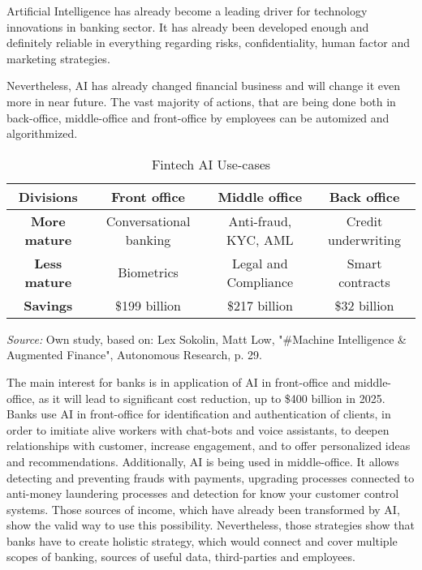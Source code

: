 



Artificial Intelligence has already become a leading driver for technology innovations in banking sector.
It has already been developed enough and definitely reliable in everything regarding risks, confidentiality, human factor and marketing strategies.

Nevertheless, AI has already changed financial business and will change it even more in near future.
The vast majority of actions, that are being done both in back-office, middle-office and front-office by employees can be automized and algorithmized.

\begin{table}
    \centering
    \begin{tabular}{| c | c | c | c |}
        \hline 
        \textbf{Divisions} &
            Front office & 
            Middle office & 
            Back office \\ \hline 
       
        \textbf{More mature} & 
            Conversational banking & 
            Anti-fraud, KYC, AML & 
            Credit underwriting \\ \hline 
       
        \textbf{Less mature} & 
            Biometrics & 
            Legal and Compliance &
            Smart contracts \\ \hline 
        \textbf{Savings} &
            \$199 billion &
            \$217 billion &
            \$32 billion \\
        \hline 
    \end{tabular}
    \caption{Fintech AI Use-cases}
    \medskip
    \footnotesize\textit{Source:} Own study, based on: Lex Sokolin, Matt Low, "\#Machine Intelligence \& Augmented Finance", Autonomous Research, p. 29.
\end{table}

The main interest for banks is in application of AI in front-office and middle-office, as it will lead to significant cost reduction, up to \$400 billion in 2025.
Banks use AI in front-office for identification and authentication of clients, in order to imitiate alive workers with chat-bots and voice assistants, to deepen relationships with customer, increase engagement, and to offer personalized ideas and recommendations.
Additionally, AI is being used in middle-office.
It allows detecting and preventing frauds with payments, upgrading processes connected to anti-money laundering processes and detection for know your customer control systems.
Those sources of income, which have already been transformed by AI, show the valid way to use this possibility.
Nevertheless, those strategies show that banks have to create holistic strategy, which would connect and cover multiple scopes of banking, sources of useful data, third-parties and employees.
\cite{autonomous_next}

